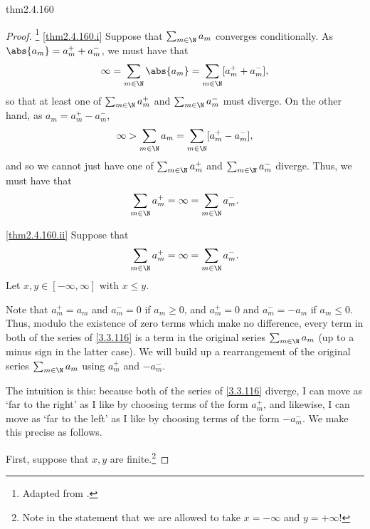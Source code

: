 \begin{thm}{}{thm2.4.160}
\begin{rmk}
\end{rmk}
\begin{proof}\footnote{Adapted from \cite{Rudin}.}
\cref{thm2.4.160.i} Suppose that $\sum _{m\in \N}a_m$ converges conditionally.  As $\abs{a_m}=a_m^++a_m^-$, we must have that
\begin{equation}
\infty =\sum _{m\in \N}\abs{a_m}=\sum _{m\in \N}[a_m^++a_m^-],
\end{equation}
so that at least one of $\sum _{m\in \N}a_m^+$ and $\sum _{m\in \N}a_m^-$ must diverge.  On the other hand, as $a_m=a_m^+-a_m^-$,
\begin{equation}
\infty >\sum _{m\in \N}a_m=\sum _{m\in \N}[a_m^+-a_m^-],
\end{equation}
and so we cannot just have one of $\sum _{m\in \N}a_m^+$ and $\sum _{m\in \N}a_m^-$ diverge.  Thus, we must have that
\begin{equation}\label{3.3.116}
\sum _{m\in \N}a_m^+=\infty =\sum _{m\in \N}a_m^-.
\end{equation}

\blankline
\noindent
\cref{thm2.4.160.ii} Suppose that
\begin{equation}
\sum _{m\in \N}a_m^+=\infty =\sum _{m\in \N}a_m^-.
\end{equation}
Let $x,y\in [-\infty ,\infty ]$ with $x\leq y$.

Note that $a_m^+=a_m$ and $a_m^-=0$ if $a_m\geq 0$, and $a_m^+=0$ and $a_m^-=-a_m$ if $a_m\leq 0$.  Thus, modulo the existence of zero terms which make no difference, every term in both of the series of \eqref{3.3.116} is a term in the original series $\sum _{m\in \N}a_m$ (up to a minus sign in the latter case).  We will build up a rearrangement of the original series $\sum _{m\in \N}a_m$ using $a_m^+$ and $-a_m^-$.

The intuition is this:  because both of the series of \eqref{3.3.116} diverge, I can move as `far to the right' as I like by choosing terms of the form $a_m^+$, and likewise, I can move as `far to the left' as I like by choosing terms of the form $-a_m^-$.  We make this precise as follows.

First, suppose that $x,y$ are finite.\footnote{Note in the statement that we are allowed to take $x=-\infty$ and $y=+\infty$!}


\end{proof}
\end{thm}
